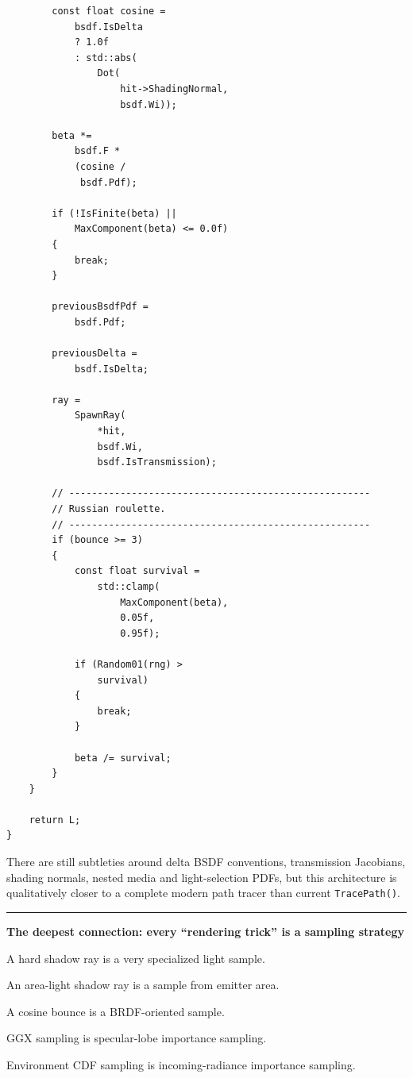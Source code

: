 \begin{verbatim}
        const float cosine =
            bsdf.IsDelta
            ? 1.0f
            : std::abs(
                Dot(
                    hit->ShadingNormal,
                    bsdf.Wi));

        beta *=
            bsdf.F *
            (cosine /
             bsdf.Pdf);

        if (!IsFinite(beta) ||
            MaxComponent(beta) <= 0.0f)
        {
            break;
        }

        previousBsdfPdf =
            bsdf.Pdf;

        previousDelta =
            bsdf.IsDelta;

        ray =
            SpawnRay(
                *hit,
                bsdf.Wi,
                bsdf.IsTransmission);

        // -----------------------------------------------------
        // Russian roulette.
        // -----------------------------------------------------
        if (bounce >= 3)
        {
            const float survival =
                std::clamp(
                    MaxComponent(beta),
                    0.05f,
                    0.95f);

            if (Random01(rng) >
                survival)
            {
                break;
            }

            beta /= survival;
        }
    }

    return L;
}
\end{verbatim}

There are still subtleties around delta BSDF conventions, transmission Jacobians, shading normals, nested media and light-selection PDFs, but this architecture is qualitatively closer to a complete modern path tracer than current \texttt{TracePath()}.

\begin{center}\rule{0.5\linewidth}{0.5pt}\end{center}

\textbf{The deepest connection: every ``rendering trick'' is a sampling strategy}

A hard shadow ray is a very specialized light sample.

An area-light shadow ray is a sample from emitter area.

A cosine bounce is a BRDF-oriented sample.

GGX sampling is specular-lobe importance sampling.

Environment CDF sampling is incoming-radiance importance sampling.

